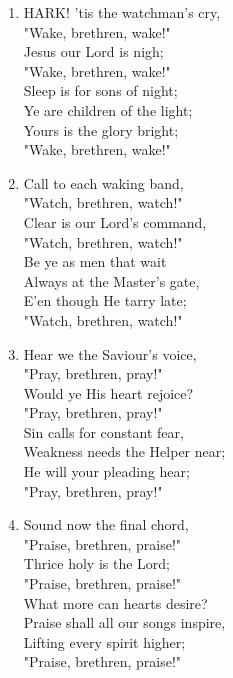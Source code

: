 \begin{enumerate}
    \item HARK! 'tis the watchman's cry, \\
        "Wake, brethren, wake!" \\
        Jesus our Lord is nigh; \\
        "Wake, brethren, wake!" \\
        Sleep is for sons of night; \\
        Ye are children of the light; \\
        Yours is the glory bright; \\
        "Wake, brethren, wake!"

    \item Call to each waking band, \\
        "Watch, brethren, watch!" \\
        Clear is our Lord's command, \\
        "Watch, brethren, watch!" \\
        Be ye as men that wait \\
        Always at the Master's gate, \\
        E'en though He tarry late; \\
        "Watch, brethren, watch!"

    \item Hear we the Saviour's voice, \\
        "Pray, brethren, pray!" \\
        Would ye His heart rejoice? \\
        "Pray, brethren, pray!" \\
        Sin calls for constant fear, \\
        Weakness needs the Helper near; \\
        He will your pleading hear; \\
        "Pray, brethren, pray!"

    \item Sound now the final chord, \\
        "Praise, brethren, praise!" \\
        Thrice holy is the Lord; \\
        "Praise, brethren, praise!" \\
        What more can hearts desire? \\
        Praise shall all our songs inspire, \\
        Lifting every spirit higher; \\
        "Praise, brethren, praise!"


\end{enumerate}
